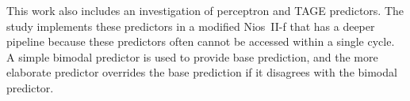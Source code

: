 This work also includes an investigation of perceptron and TAGE predictors. The study implements these predictors in a modified Nios~II-f that has a deeper pipeline because these predictors often cannot be accessed within a single cycle. A simple bimodal predictor is used to provide base prediction, and the more elaborate predictor overrides the base prediction if it disagrees with the bimodal predictor.


